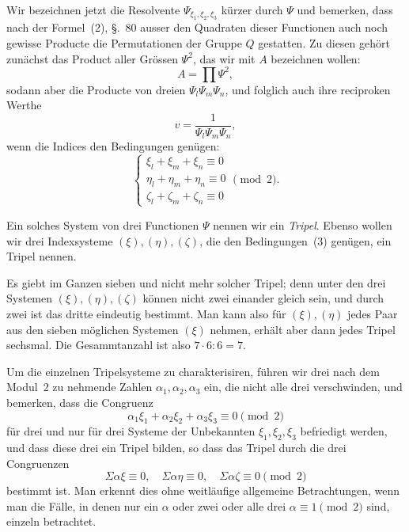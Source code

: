 \documentclass[12pt,a4paper]{article}
\begin{document}
Wir bezeichnen jetzt die Resolvente $\Psi_{\xi_1,\xi_2,\xi_3}$ k\"urzer durch $\Psi$ und bemerken, dass nach der Formel~(2), \S.~80 ausser den Quadraten dieser Functionen auch noch gewisse Producte die Permutationen der Gruppe $Q$ gestatten. Zu diesen geh\"ort zun\"achst das Product aller Gr\"ossen $\Psi^2$, das wir mit $A$ bezeichnen wollen:
\begin{equation}
\tag{1}
A = \prod \Psi^2,
\end{equation}
sodann aber die Producte von dreien $\Psi_l\Psi_m\Psi_n$, und folglich auch ihre reciproken Werthe
\begin{equation}
\tag{2}
v = \frac{1}{\Psi_l\Psi_m\Psi_n},
\end{equation}
wenn die Indices den Bedingungen gen\"ugen:
\begin{equation}
\tag{3}
\begin{cases}
\xi_l + \xi_m + \xi_n \equiv 0\\
\eta_l + \eta_m + \eta_n \equiv 0\\
\zeta_l + \zeta_m + \zeta_n \equiv 0
\end{cases}
\pmod 2.
\end{equation}

Ein solches System von drei Functionen $\Psi$ nennen wir ein \emph{Tripel}. Ebenso wollen wir drei Indexsysteme $(\xi),(\eta),(\zeta)$, die den Bedingungen~(3) gen\"ugen, ein Tripel nennen.

Es giebt im Ganzen sieben und nicht mehr solcher Tripel; denn unter den drei Systemen $(\xi),(\eta),(\zeta)$ k\"onnen nicht zwei einander gleich sein, und durch zwei ist das dritte eindeutig bestimmt. Man kann also f\"ur $(\xi),(\eta)$ jedes Paar aus den sieben m\"oglichen Systemen $(\xi)$ nehmen, erh\"alt aber dann jedes Tripel sechsmal. Die Gesammtanzahl ist also $7\cdot6:6=7$.

Um die einzelnen Tripelsysteme zu charakterisiren, f\"uhren wir drei nach dem Modul~2 zu nehmende Zahlen $\alpha_1,\alpha_2,\alpha_3$ ein, die nicht alle drei verschwinden, und bemerken, dass die Congruenz
\begin{equation}
\tag{4}
\alpha_1\xi_1 + \alpha_2\xi_2 + \alpha_3\xi_3 \equiv 0 \pmod 2
\end{equation}
f\"ur drei und nur f\"ur drei Systeme der Unbekannten $\xi_1,\xi_2,\xi_3$ befriedigt werden, und dass diese drei ein Tripel bilden, so dass das Tripel durch die drei Congruenzen
\begin{equation}
\tag{5}
\Sigma\alpha\xi \equiv 0,\quad \Sigma\alpha\eta \equiv 0,\quad \Sigma\alpha\zeta \equiv 0 \pmod 2
\end{equation}
bestimmt ist. Man erkennt dies ohne weitl\"aufige allgemeine Betrachtungen, wenn man die F\"alle, in denen nur ein $\alpha$ oder zwei oder alle drei $\alpha \equiv 1 \pmod 2$ sind, einzeln betrachtet.
\end{document}
